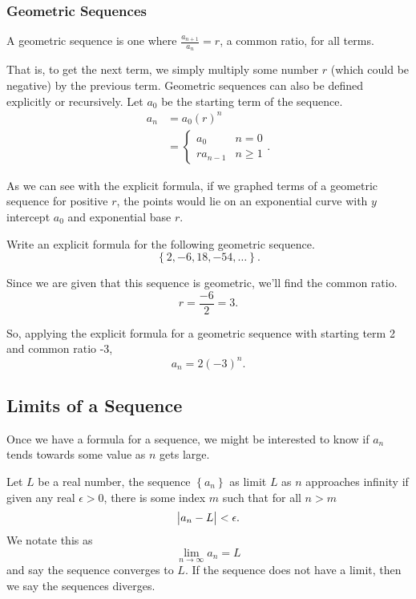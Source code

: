 \subsubsection{Geometric Sequences}
\begin{definition}
	A geometric sequence is one where $\frac{a_{n+1}}{a_n} = r$, a common ratio, for all terms.
\end{definition}

That is, to get the next term, we simply multiply some number $r$ (which could be negative) by the previous term.
Geometric sequences can also be defined explicitly or recursively.
Let $a_0$ be the starting term of the sequence.
\begin{align*}
	a_n &= a_0(r)^n \\
	&= \begin{cases}
		a_0 & n = 0 \\
		ra_{n-1} & n \geq 1
	\end{cases}.
\end{align*}

As we can see with the explicit formula, if we graphed terms of a geometric sequence for positive $r$, the points would lie on an exponential curve with $y$ intercept $a_0$ and exponential base $r$.

\begin{example}
	Write an explicit formula for the following geometric sequence.
	\begin{equation*}
		\left\{2,-6,18,-54,\ldots\right\}.
	\end{equation*}
\end{example}
\begin{answer}
	Since we are given that this sequence is geometric, we'll find the common ratio.
	\begin{equation*}
		r = \frac{-6}{2} = 3.
	\end{equation*}
	
	So, applying the explicit formula for a geometric sequence with starting term 2 and common ratio -3,
	\begin{equation*}
		a_n = 2(-3)^n.
	\end{equation*}
\end{answer}

\subsection{Limits of a Sequence}
Once we have a formula for a sequence, we might be interested to know if $a_n$ tends towards some value as $n$ gets large.
\begin{definition}
	Let $L$ be a real number, the sequence $\left\{a_n\right\}$ as limit $L$ as $n$ approaches infinity if given any real $\epsilon > 0$, there is some index $m$ such that for all $n > m$
	\begin{equation*}
		\big\lvert a_n - L \big\rvert < \epsilon.
	\end{equation*}
	We notate this as 
	\begin{equation*}
		\lim_{n\to\infty}{a_n} = L
	\end{equation*}
	and say the sequence converges to $L$.
	If the sequence does not have a limit, then we say the sequences diverges.
\end{definition}


